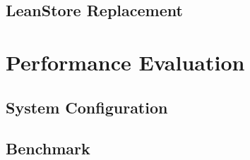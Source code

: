 





\subsection[LeanStore]{LeanStore Replacement} \label{subsec:leanstore}

    

\section{Performance Evaluation} \label{sec:page_evictioners_performance_evaluation}

    

\subsection{System Configuration} \label{subsec:page_evictioners_system_configuration}

    

\subsection{Benchmark} \label{subsec:page_evictioners_benchmark}

